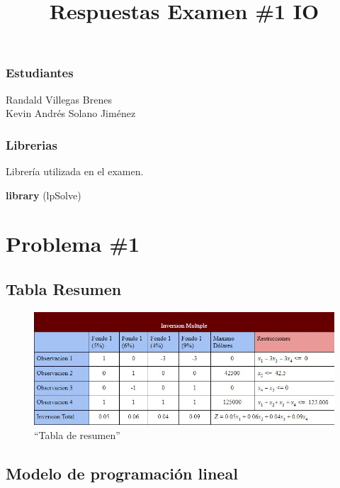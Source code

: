 \documentclass[
]{article}
\title{Respuestas Examen \#1 IO}
\author{}
\date{\vspace{-2.5em}}
\newenvironment{Shaded}{\begin{snugshade}}{\end{snugshade}}
\newcommand{\KeywordTok}[1]{\textcolor[rgb]{0.13,0.29,0.53}{\textbf{#1}}}
\newcommand{\NormalTok}[1]{#1}
\begin{document}
\maketitle

\hypertarget{estudiantes}{%
\subsubsection{Estudiantes}\label{estudiantes}}

Randald Villegas Brenes\\
Kevin Andrés Solano Jiménez

\hypertarget{librerias}{%
\subsubsection{Librerias}\label{librerias}}

Librería utilizada en el examen.

\begin{Shaded}
\begin{Highlighting}[]
\KeywordTok{library}\NormalTok{ (lpSolve)}
\end{Highlighting}
\end{Shaded}

\hypertarget{problema-1}{%
\section{Problema \#1}\label{problema-1}}

\hypertarget{tabla-resumen}{%
\subsection{Tabla Resumen}\label{tabla-resumen}}

\begin{figure}
\centering
\includegraphics{s1.jpeg}
\caption{``Tabla de resumen''}
\end{figure}

\hypertarget{modelo-de-programaciuxf3n-lineal}{%
\subsection{\texorpdfstring{\textbf{Modelo de programación
lineal}}{Modelo de programación lineal}}\label{modelo-de-programaciuxf3n-lineal}}
\end{document}
